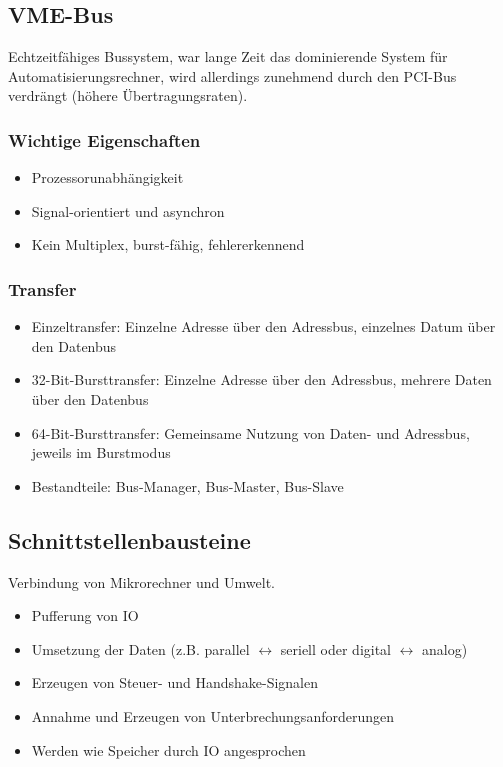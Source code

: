 \subsection{VME-Bus}

Echtzeitfähiges Bussystem, war lange Zeit das dominierende System für Automatisierungsrechner, wird allerdings zunehmend durch den PCI-Bus verdrängt (höhere Übertragungsraten).

\subsubsection{Wichtige Eigenschaften}
\begin{itemize}
	\item Prozessorunabhängigkeit
	\item Signal-orientiert und asynchron
	\item Kein Multiplex, burst-fähig, fehlererkennend
\end{itemize}

\subsubsection{Transfer}
\begin{itemize}
	\item Einzeltransfer: Einzelne Adresse über den Adressbus, einzelnes Datum über den Datenbus
	\item 32-Bit-Bursttransfer: Einzelne Adresse über den Adressbus, mehrere Daten über den Datenbus
	\item 64-Bit-Bursttransfer: Gemeinsame Nutzung von Daten- und Adressbus, jeweils im Burstmodus
	\item Bestandteile: Bus-Manager, Bus-Master, Bus-Slave
\end{itemize}


\subsection{Schnittstellenbausteine}
Verbindung von Mikrorechner und Umwelt.
\begin{itemize}
	\item Pufferung von IO
	\item Umsetzung der Daten (z.B. parallel $\leftrightarrow$ seriell oder digital $\leftrightarrow$ analog)
	\item Erzeugen von Steuer- und Handshake-Signalen
	\item Annahme und Erzeugen von Unterbrechungsanforderungen
	\item Werden wie Speicher durch IO angesprochen
\end{itemize}



